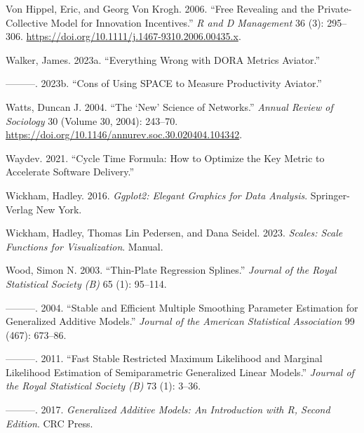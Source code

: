 \documentclass[
]{article}
\newlength{\cslhangindent}
\newenvironment{CSLReferences}[2] %
 {\begin{list}{}{%
  \setlength{\itemindent}{0pt}
  \setlength{\leftmargin}{0pt}
  \setlength{\parsep}{0pt}
  \ifodd #1
   \setlength{\leftmargin}{\cslhangindent}
   \setlength{\itemindent}{-1\cslhangindent}
  \fi
  \setlength{\itemsep}{#2\baselineskip}}}
 {\end{list}}
\begin{document}
\begin{CSLReferences}{1}{0}
Von Hippel, Eric, and Georg Von Krogh. 2006. {``Free Revealing and the
Private-Collective Model for Innovation Incentives.''} \emph{R and D
Management} 36 (3): 295--306.
\url{https://doi.org/10.1111/j.1467-9310.2006.00435.x}.

Walker, James. 2023a. {``Everything {Wrong} with {DORA Metrics}
{\textbar} {Aviator}.''}

---------. 2023b. {``Cons of {Using SPACE} to {Measure Productivity}
{\textbar} {Aviator}.''}

Watts, Duncan J. 2004. {``The {`{New}'} {Science} of {Networks}.''}
\emph{Annual Review of Sociology} 30 (Volume 30, 2004): 243--70.
\url{https://doi.org/10.1146/annurev.soc.30.020404.104342}.

Waydev. 2021. {``Cycle {Time Formula}: {How} to {Optimize} the {Key
Metric} to {Accelerate Software Delivery}.''}

Wickham, Hadley. 2016. \emph{Ggplot2: {Elegant} Graphics for Data
Analysis}. Springer-Verlag New York.

Wickham, Hadley, Thomas Lin Pedersen, and Dana Seidel. 2023.
\emph{Scales: {Scale} Functions for Visualization}. Manual.

Wood, Simon N. 2003. {``Thin-Plate Regression Splines.''} \emph{Journal
of the Royal Statistical Society (B)} 65 (1): 95--114.

---------. 2004. {``Stable and Efficient Multiple Smoothing Parameter
Estimation for Generalized Additive Models.''} \emph{Journal of the
American Statistical Association} 99 (467): 673--86.

---------. 2011. {``Fast Stable Restricted Maximum Likelihood and
Marginal Likelihood Estimation of Semiparametric Generalized Linear
Models.''} \emph{Journal of the Royal Statistical Society (B)} 73 (1):
3--36.

---------. 2017. \emph{Generalized {Additive Models}: {An Introduction}
with {R}, {Second Edition}}. CRC Press.


\end{CSLReferences}
\end{document}
